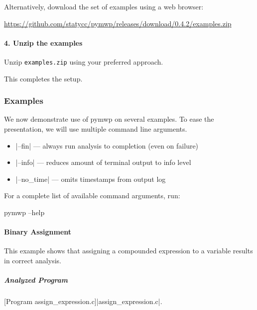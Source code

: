 Alternatively, download the set of examples using a web browser:

\url{https://github.com/statycc/pymwp/releases/download/0.4.2/examples.zip}

\paragraph*{4. Unzip the examples}
Unzip \texttt{examples.zip} using your preferred approach.

This completes the setup.

\subsubsection{Examples}\label{guide-examples}

We now demonstrate use of pymwp on several examples.
To ease the presentation, we will use multiple command line arguments.

\begin{itemize}
\item \pr|--fin| --- always run analysis to completion (even on failure)
\item \pr|--info| --- reduces amount of terminal output to info level
\item \pr|--no_time| --- omits timestamps from output log
\end{itemize}

For a complete list of available command arguments, run:

\begin{center}
\begin{minipage}{\textwidth}
\begin{cmdlisting}[label={lst:help-cmd}]
pymwp --help
\end{cmdlisting}
\end{minipage}
\end{center}

\paragraph{Binary Assignment}\label{binary-assignment}
This example shows that assigning a compounded expression to a variable results in correct analysis.

\subparagraph*{Analyzed Program}

\begin{center}
\begin{minipage}{\textwidth}
\captionsetup{type=lstlisting}
[Program assign\_expression.c]{\pr|assign\_expression.c|.}
\label{lst:assgn_exp}
\end{minipage}
\end{center}

